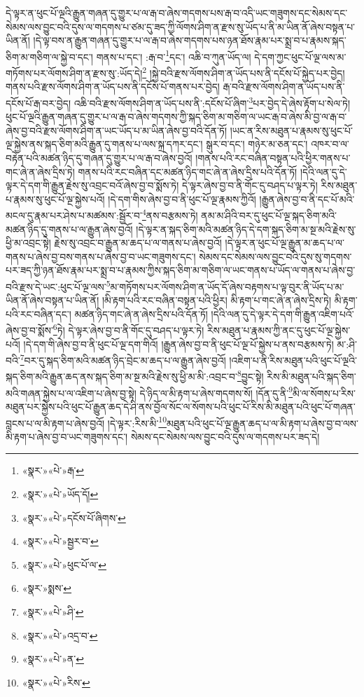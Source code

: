 དེ་ལྟར་ན་ཕུང་པོ་ལྔའི་རྒྱུན་གཞན་དུ་གྱུར་པ་ལ་རྒ་བ་ཞེས་གདགས་པས་རྒ་བ་འདི་ཡང་གཟུགས་དང་སེམས་དང་སེམས་ལས་བྱུང་བའི་དུས་ལ་གདགས་པ་ཙམ་དུ་ཟད་ཀྱི་ལོགས་ཤིག་ན་རྫས་སུ་ཡོད་པ་ནི་མ་ཡིན་ནོ་ཞེས་བསྟན་པ་ཡིན་ནོ། །དེ་ལྟ་བས་ན་རྒྱུན་གཞན་དུ་གྱུར་པ་ལ་རྒ་བ་ཞེས་གདགས་པས་ཉན་ཐོས་རྣམ་པར་སྨྲ་བ་པ་རྣམས་སྐད་ཅིག་མ་གཅིག་ལ་སྐྱེ་བ་དང་། གནས་པ་དང་། :རྒ་བ་\footnote{«སྣར་»«པེ་»རྒ་}དང་། འཆི་བ་ཀུན་ཡོད་ལ། དེ་དག་ཀྱང་ཕུང་པོ་ལྔ་ལས་མ་གཏོགས་པར་ལོགས་ཤིག་ན་རྫས་སུ་:ཡོད་དེ།\footnote{«སྣར་»«པེ་»ཡོད་དོ།} །སྐྱེ་བའི་རྫས་ལོགས་ཤིག་ན་ཡོད་པས་ནི་དངོས་པོ་སྐྱེད་པར་བྱེད། གནས་པའི་རྫས་ལོགས་ཤིག་ན་ཡོད་པས་ནི་དངོས་པོ་གནས་པར་བྱེད། རྒ་བའི་རྫས་ལོགས་ཤིག་ན་ཡོད་པས་ནི་དངོས་པོ་རྒ་བར་བྱེད། འཆི་བའི་རྫས་ལོགས་ཤིག་ན་ཡོད་པས་ནི་:དངོས་པོ་ཞིག་\footnote{«སྣར་»«པེ་»དངོས་པོ་ཞིགས་}པར་བྱེད་དེ་ཞེས་རྟོག་པ་སེལ་ཏེ། ཕུང་པོ་ལྔའི་རྒྱུན་གཞན་དུ་གྱུར་པ་ལ་རྒ་བ་ཞེས་གདགས་ཀྱི་སྐད་ཅིག་མ་གཅིག་ལ་ཡང་རྒ་བ་ཞེས་མི་བྱ་ལ་རྒ་བ་ཞེས་བྱ་བའི་རྫས་ལོགས་ཤིག་ན་ཡང་ཡོད་པ་མ་ཡིན་ཞེས་བྱ་བའི་དོན་ཏོ། །ཡང་ན་རིས་མཐུན་པ་རྣམས་སུ་ཕུང་པོ་ལྔ་སྐྱེས་ནས་སྐད་ཅིག་མའི་རྒྱུན་དུ་གནས་པ་ལས་སྐྲ་དཀར་དང་། སྒུར་བ་དང་། གཉེར་མ་ཅན་དང་། འཁར་བ་ལ་བརྟེན་པའི་མཚན་ཉིད་དུ་གཞན་དུ་གྱུར་པ་ལ་རྒ་བ་ཞེས་བྱའོ། །གནས་པའི་རང་བཞིན་བསྟན་པའི་ཕྱིར་གནས་པ་གང་ཞེ་ན་ཞེས་དྲིས་ཏེ། གནས་པའི་རང་བཞིན་དང་མཚན་ཉིད་གང་ཞེ་ན་ཞེས་དྲིས་པའི་དོན་ཏོ། །དེའི་ལན་དུ་དེ་ལྟར་དེ་དག་གི་རྒྱུན་རྗེས་སུ་འབྲང་བའོ་ཞེས་བྱ་བ་སྨོས་ཏེ། དེ་ལྟར་ཞེས་བྱ་བ་ནི་གོང་དུ་བཤད་པ་ལྟར་ཏེ། རིས་མཐུན་པ་རྣམས་སུ་ཕུང་པོ་ལྔ་སྐྱེས་པའོ། །དེ་དག་གིས་ཞེས་བྱ་བ་ནི་ཕུང་པོ་ལྔ་རྣམས་ཀྱིའོ། །རྒྱུན་ཞེས་བྱ་བ་ནི་དང་པོ་མའི་མངལ་དུ་རྣམ་པར་ཤེས་པ་མཚམས་:སྦྱོར་བ་\footnote{«སྣར་»«པེ་»སྦྱར་བ་}ནས་བརྩམས་ཏེ། ནམ་མ་ཤིའི་བར་དུ་ཕུང་པོ་ལྔ་སྐད་ཅིག་མའི་མཚན་ཉིད་དུ་གནས་པ་ལ་རྒྱུན་ཞེས་བྱའོ། །དེ་ལྟར་ན་སྐད་ཅིག་མའི་མཚན་ཉིད་དེ་དག་སྐད་ཅིག་མ་སྔ་མའི་རྗེས་སུ་ཕྱི་མ་འབྲང་སྟེ། རྗེས་སུ་འབྲང་བ་རྒྱུན་མ་ཆད་པ་ལ་གནས་པ་ཞེས་བྱའོ། །དེ་ལྟར་ན་ཕུང་པོ་ལྔ་རྒྱུན་མ་ཆད་པ་ལ་གནས་པ་ཞེས་བྱ་བས་གནས་པ་ཞེས་བྱ་བ་ཡང་གཟུགས་དང་། སེམས་དང་སེམས་ལས་བྱུང་བའི་དུས་སུ་གདགས་པར་ཟད་ཀྱི་ཉན་ཐོས་རྣམ་པར་སྨྲ་བ་པ་རྣམས་ཀྱིས་སྐད་ཅིག་མ་གཅིག་ལ་ཡང་གནས་པ་ཡོད་ལ་གནས་པ་ཞེས་བྱ་བའི་རྫས་དེ་ཡང་:ཕུང་པོ་ལྔ་ལས་\footnote{«སྣར་»«པེ་»ཕུང་པོ་ལ་}མ་གཏོགས་པར་ལོགས་ཤིག་ན་ཡོད་དོ་ཞེས་བརྟགས་པ་ལྟ་བུར་ནི་ཡོད་པ་མ་ཡིན་ནོ་ཞེས་བསྟན་པ་ཡིན་ནོ། །མི་རྟག་པའི་རང་བཞིན་བསྟན་པའི་ཕྱིར། མི་རྟག་པ་གང་ཞེ་ན་ཞེས་དྲིས་ཏེ། མི་རྟག་པའི་རང་བཞིན་དང་། མཚན་ཉིད་གང་ཞེ་ན་ཞེས་དྲིས་པའི་དོན་ཏོ། །དེའི་ལན་དུ་དེ་ལྟར་དེ་དག་གི་རྒྱུན་འཇིག་པའོ་ཞེས་བྱ་བ་སྨོས་\footnote{«སྣར་»སྨས་}ཏེ། དེ་ལྟར་ཞེས་བྱ་བ་ནི་གོང་དུ་བཤད་པ་ལྟར་ཏེ། རིས་མཐུན་པ་རྣམས་ཀྱི་ནང་དུ་ཕུང་པོ་ལྔ་སྐྱེས་པའོ། །དེ་དག་གི་ཞེས་བྱ་བ་ནི་ཕུང་པོ་ལྔ་དག་གིའོ། །རྒྱུན་ཞེས་བྱ་བ་ནི་ཕུང་པོ་ལྔ་པོ་སྐྱེས་པ་ནས་བརྩམས་ཏེ། མ་:ཤི་བའི་\footnote{«སྣར་»«པེ་»ཤི་}བར་དུ་སྐད་ཅིག་མའི་མཚན་ཉིད་བྲེང་མ་ཆད་པ་ལ་རྒྱུན་ཞེས་བྱའོ། །འཇིག་པ་ནི་རིས་མཐུན་པའི་ཕུང་པོ་ལྔའི་སྐད་ཅིག་མའི་རྒྱུན་ཆད་ནས་སྐད་ཅིག་མ་སྔ་མའི་རྗེས་སུ་ཕྱི་མ་མི་:འབྲང་བ་\footnote{«སྣར་»«པེ་»འདྲ་བ་}བྱུང་སྟེ། རིས་མི་མཐུན་པའི་སྐད་ཅིག་མའི་གཞན་སྐྱེས་པ་ལ་འཇིག་པ་ཞེས་བྱ་སྟེ། དེ་ཉིད་ལ་མི་རྟག་པ་ཞེས་གདགས་སོ། །དོན་དུ་ནི་\footnote{«སྣར་»«པེ་»ན་}མི་ལ་སོགས་པ་རིས་མཐུན་པར་སྐྱེས་པའི་ཕུང་པོ་རྒྱུན་ཆད་དེ་ཤི་ནས་བྱོལ་སོང་ལ་སོགས་པའི་ཕུང་པོ་རིས་མི་མཐུན་པའི་ཕུང་པོ་གཞན་བླངས་པ་ལ་མི་རྟག་པ་ཞེས་བྱའོ། །དེ་ལྟར་:རིས་མི་\footnote{«སྣར་»«པེ་»རིས་}མཐུན་པའི་ཕུང་པོ་ལྔ་རྒྱུན་ཆད་པ་ལ་མི་རྟག་པ་ཞེས་བྱ་བ་ལས་མི་རྟག་པ་ཞེས་བྱ་བ་ཡང་གཟུགས་དང་། སེམས་དང་སེམས་ལས་བྱུང་བའི་དུས་ལ་གདགས་པར་ཟད་དེ། 